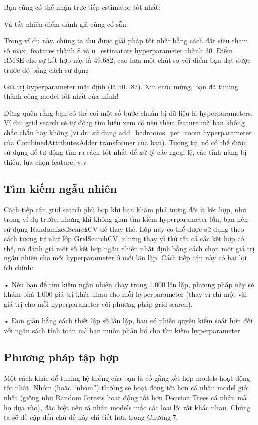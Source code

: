 Bạn cũng có thể nhận trực tiếp estimator tốt nhất:

Và tất nhiên điểm đánh giá cũng có sẵn:

Trong ví dụ này, chúng ta thu được giải pháp tốt nhất bằng cách đặt siêu tham số max\_features thành 8 và n\_estimators hyperparameter thành 30. Điểm RMSE cho sự kết hợp này là 49.682, cao hơn một chút so với điểm bạn đạt được trước đó bằng cách sử dụng

Giá trị hyperparameter mặc định (là 50.182). Xin chúc mừng, bạn đã tuning thành công model tốt nhất của mình!

Đừng quên rằng bạn có thể coi một số bước chuẩn bị dữ liệu là hyperparameters. Ví dụ: grid search sẽ tự động tìm hiểu xem có nên thêm feature mà bạn không chắc chắn hay không (ví dụ: sử dụng add\_bedrooms\_per\_room hyperparameter của CombinedAttributesAdder transformer của bạn). Tương tự, nó có thể được sử dụng để tự động tìm ra cách tốt nhất để xử lý các ngoại lệ, các tính năng bị thiếu, lựa chọn feature, v.v.

\subsection{Tìm kiếm ngẫu nhiên}

Cách tiếp cận grid search phù hợp khi bạn khám phá tương đối ít kết hợp, như trong ví dụ trước, nhưng khi không gian tìm kiếm hyperparameter lớn, bạn nên sử dụng RandomizedSearchCV để thay thế. Lớp này có thể được sử dụng theo cách tương tự như lớp GridSearchCV, nhưng thay vì thử tất cả các kết hợp có thể, nó đánh giá một số kết hợp ngẫu nhiên nhất định bằng cách chọn một giá trị ngẫu nhiên cho mỗi hyperparameter ở mỗi lần lặp. Cách tiếp cận này có hai lợi ích chính:

• Nếu bạn để tìm kiếm ngẫu nhiên chạy trong 1.000 lần lặp, phương pháp này sẽ khám phá 1.000 giá trị khác nhau cho mỗi hyperparameter (thay vì chỉ một vài giá trị cho mỗi hyperparameter với phương pháp grid search).

• Đơn giản bằng cách thiết lập số lần lặp, bạn có nhiều quyền kiểm soát hơn đối với ngân sách tính toán mà bạn muốn phân bổ cho tìm kiếm hyperparameter.

\subsection{Phương pháp tập hợp}

Một cách khác để tuning hệ thống của bạn là cố gắng kết hợp models hoạt động tốt nhất. Nhóm (hoặc “nhóm”) thường sẽ hoạt động tốt hơn cá nhân model giỏi nhất (giống như Random Forests hoạt động tốt hơn Decision Trees cá nhân mà họ dựa vào), đặc biệt nếu cá nhân models mắc các loại lỗi rất khác nhau. Chúng ta sẽ đề cập đến chủ đề này chi tiết hơn trong Chương 7.

